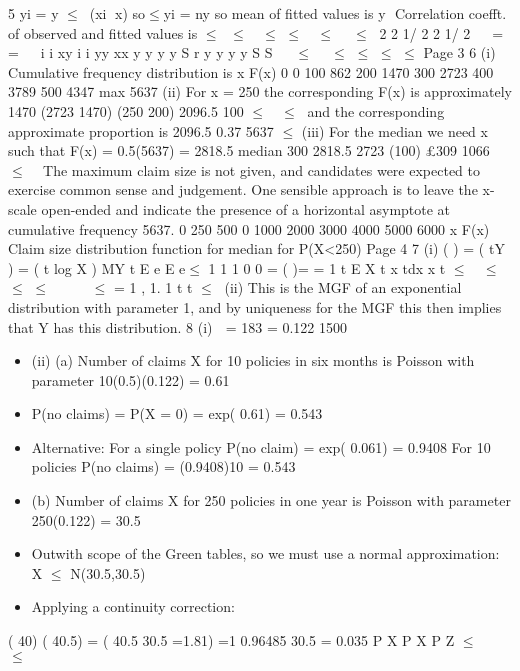 \documentclass[a4paper,12pt]{article}
\begin{document}
5 yi = y $\leq$(xi  x) so$\leq$yi = ny so mean of fitted values is y
 Correlation coefft. of observed and fitted values is
$\leq$ $\leq$ 
$\leq$ $\leq$  $\leq$   $\leq$  2 2 1/ 2 2 1/ 2
 
= =
 
i i xy
i i yy xx
y y y y S
r
y y y y S S
  $\leq$
  $\leq$
$\leq$
$\leq$ $\leq$
Page 3
6 (i) Cumulative frequency distribution is
x F(x)
0 0
100 862
200 1470
300 2723
400 3789
500 4347
max 5637
(ii) For x = 250 the corresponding F(x) is approximately
1470 (2723 1470) (250 200) 2096.5
100
$\leq$
 $\leq$ 
and the corresponding approximate proportion is 2096.5 0.37
5637
$\leq$
(iii) For the median we need x such that F(x) = 0.5(5637) = 2818.5
median 300 2818.5 2723 (100) £309
1066
$\leq$
  
The maximum claim size is not given, and candidates were expected to exercise common
sense and judgement. One sensible approach is to leave the x-scale open-ended and indicate
the presence of a horizontal asymptote at cumulative frequency 5637.
0 250 500
0
1000
2000
3000
4000
5000
6000
x
F(x)
Claim size distribution function
for median
for P(X<250)
Page 4
7 (i) ( ) = ( tY ) = ( t log X )
MY t E e E e$\leq$
1 1 1
0
0
= ( )= =
1
t
E X t x tdx x
t
$\leq$ 
$\leq$ $\leq$
$\leq$ 
 
  
$\leq$
= 1 , 1.
1
t
t
$\leq$

(ii) This is the MGF of an exponential distribution with parameter 1, and by
uniqueness for the MGF this then implies that Y has this distribution.
8 (i)  = 183 = 0.122
1500

\begin{itemize}
    \item (ii) (a) Number of claims X for 10 policies in six months is Poisson with
parameter 10(0.5)(0.122) = 0.61
\item P(no claims) = P(X = 0) = exp(	0.61) = 0.543
\item Alternative:
For a single policy P(no claim) = exp(	0.061) = 0.9408
For 10 policies P(no claims) = (0.9408)10 = 0.543
\item (b) Number of claims X for 250 policies in one year is Poisson with
parameter 250(0.122) = 30.5
\item Outwith scope of the Green tables, so we must use a normal
approximation:
X $\leq$ N(30.5,30.5)
\item Applying a continuity correction:
\end{itemize}

( 40) ( 40.5) = ( 40.5 30.5 =1.81) =1 0.96485
30.5
= 0.035
P X P X P Z $\leq$
    $\leq$
\end{document}
